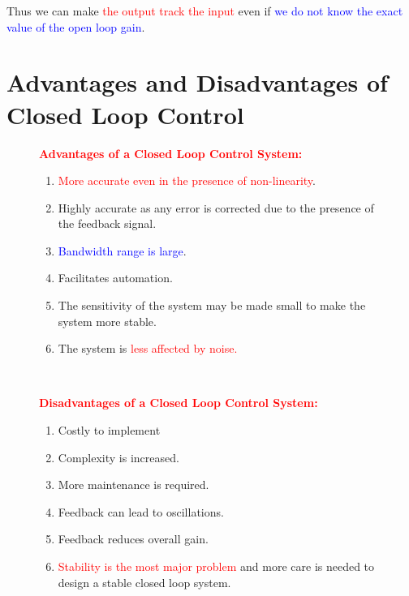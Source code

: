 \documentclass[
  14pt,
  a4paper,
  oneside,
  open=any,
  a4paper,
  14pt]{report}
\providecommand{\tightlist}{%
  \setlength{\itemsep}{0pt}\setlength{\parskip}{0pt}}\usepackage{longtable,booktabs,array}
\begin{document}
Thus we can make \textcolor{red}{the output track the input} even if
\textcolor{blue}{we do not know the exact value of the open loop gain}.

\section{Advantages and Disadvantages of Closed Loop
Control}\label{advantages-and-disadvantages-of-closed-loop-control}

\begin{figure}[h!]

\begin{minipage}{0.47\linewidth}
\textcolor{red}{\textbf{Advantages of a Closed Loop Control System:}}

\begin{enumerate}
\def\labelenumi{\arabic{enumi}.}
\tightlist
\item
  \textcolor{red}{More accurate even in the presence of non-linearity}.
\item
  Highly accurate as any error is corrected due to the presence of the
  feedback signal.
\item
  \textcolor{blue}{Bandwidth range is large}.
\item
  Facilitates automation.
\item
  The sensitivity of the system may be made small to make the system
  more stable.
\item
  The system is \textcolor{red}{less affected by noise.}
\end{enumerate}

\end{minipage}%
%
\begin{minipage}{0.05\linewidth}
~\end{minipage}%
%
\begin{minipage}{0.47\linewidth}
\textcolor{red}{\textbf{Disadvantages of a Closed Loop Control System:}}

\begin{enumerate}
\def\labelenumi{\arabic{enumi}.}
\tightlist
\item
  Costly to implement
\item
  Complexity is increased.
\item
  More maintenance is required.
\item
  Feedback can lead to oscillations.
\item
  Feedback reduces overall gain.
\item
  \textcolor{red}{Stability is the most major problem} and more care is
  needed to design a stable closed loop system.
\end{enumerate}

\end{minipage}%
%
\begin{minipage}{0.01\linewidth}
~\end{minipage}%

\end{figure}%
\end{document}
